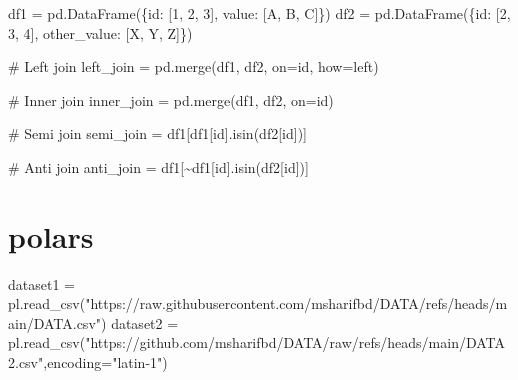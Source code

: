 \documentclass[
  letterpaper,
  DIV=11,
  numbers=noendperiod]{scrreprt}
\newenvironment{Shaded}{\begin{snugshade}}{\end{snugshade}}
\newcommand{\CommentTok}[1]{\textcolor[rgb]{0.37,0.37,0.37}{#1}}
\newcommand{\DecValTok}[1]{\textcolor[rgb]{0.68,0.00,0.00}{#1}}
\newcommand{\NormalTok}[1]{\textcolor[rgb]{0.00,0.23,0.31}{#1}}
\newcommand{\OperatorTok}[1]{\textcolor[rgb]{0.37,0.37,0.37}{#1}}
\newcommand{\StringTok}[1]{\textcolor[rgb]{0.13,0.47,0.30}{#1}}
\begin{document}
\begin{Shaded}
\begin{Highlighting}[]
\NormalTok{df1 }\OperatorTok{=}\NormalTok{ pd.DataFrame(\{}\StringTok{\textquotesingle{}id\textquotesingle{}}\NormalTok{: [}\DecValTok{1}\NormalTok{, }\DecValTok{2}\NormalTok{, }\DecValTok{3}\NormalTok{], }\StringTok{\textquotesingle{}value\textquotesingle{}}\NormalTok{: [}\StringTok{\textquotesingle{}A\textquotesingle{}}\NormalTok{, }\StringTok{\textquotesingle{}B\textquotesingle{}}\NormalTok{, }\StringTok{\textquotesingle{}C\textquotesingle{}}\NormalTok{]\})}
\NormalTok{df2 }\OperatorTok{=}\NormalTok{ pd.DataFrame(\{}\StringTok{\textquotesingle{}id\textquotesingle{}}\NormalTok{: [}\DecValTok{2}\NormalTok{, }\DecValTok{3}\NormalTok{, }\DecValTok{4}\NormalTok{], }\StringTok{\textquotesingle{}other\_value\textquotesingle{}}\NormalTok{: [}\StringTok{\textquotesingle{}X\textquotesingle{}}\NormalTok{, }\StringTok{\textquotesingle{}Y\textquotesingle{}}\NormalTok{, }\StringTok{\textquotesingle{}Z\textquotesingle{}}\NormalTok{]\})}

\CommentTok{\# Left join}
\NormalTok{left\_join }\OperatorTok{=}\NormalTok{ pd.merge(df1, df2, on}\OperatorTok{=}\StringTok{\textquotesingle{}id\textquotesingle{}}\NormalTok{, how}\OperatorTok{=}\StringTok{\textquotesingle{}left\textquotesingle{}}\NormalTok{)}

\CommentTok{\# Inner join}
\NormalTok{inner\_join }\OperatorTok{=}\NormalTok{ pd.merge(df1, df2, on}\OperatorTok{=}\StringTok{\textquotesingle{}id\textquotesingle{}}\NormalTok{)}

\CommentTok{\# Semi join}
\NormalTok{semi\_join }\OperatorTok{=}\NormalTok{ df1[df1[}\StringTok{\textquotesingle{}id\textquotesingle{}}\NormalTok{].isin(df2[}\StringTok{\textquotesingle{}id\textquotesingle{}}\NormalTok{])]}

\CommentTok{\# Anti join}
\NormalTok{anti\_join }\OperatorTok{=}\NormalTok{ df1[}\OperatorTok{\textasciitilde{}}\NormalTok{df1[}\StringTok{\textquotesingle{}id\textquotesingle{}}\NormalTok{].isin(df2[}\StringTok{\textquotesingle{}id\textquotesingle{}}\NormalTok{])]}
\end{Highlighting}
\end{Shaded}

\section{polars}

\begin{Shaded}
\begin{Highlighting}[]
\NormalTok{dataset1 }\OperatorTok{=}\NormalTok{ pl.read\_csv(}\StringTok{"https://raw.githubusercontent.com/msharifbd/DATA/refs/heads/main/DATA.csv"}\NormalTok{)}
\NormalTok{dataset2 }\OperatorTok{=}\NormalTok{ pl.read\_csv(}\StringTok{"https://github.com/msharifbd/DATA/raw/refs/heads/main/DATA2.csv"}\NormalTok{,encoding}\OperatorTok{=}\StringTok{"latin{-}1"}\NormalTok{)}
\end{Highlighting}
\end{Shaded}
\end{document}
